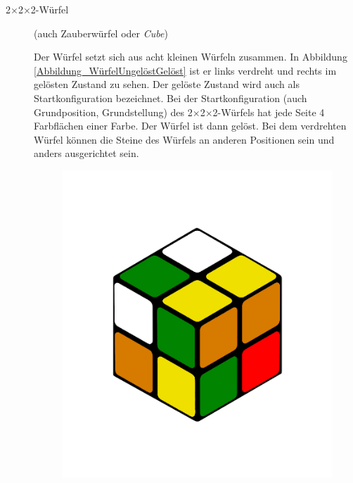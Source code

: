 \documentclass[12pt,a4paper, usenames, dvipsnames]{article}
\theoremstyle{mystyle}
\theoremstyle{definition}
\newcommand{\Ttwo}{2$\times$2$\times$2-}
\begin{document}
\begin{description}


\item[\Ttwo Würfel] (auch Zauberwürfel oder \textit{Cube}) 

Der Würfel setzt sich aus acht kleinen Würfeln zusammen.
In Abbildung \ref{Abbildung_WürfelUngelöstGelöst} ist er links verdreht und rechts im gelösten Zustand zu sehen. Der gelöste Zustand wird auch als Startkonfiguration bezeichnet.
Bei der Startkonfiguration (auch Grundposition, Grundstellung) des \Ttwo Würfels hat jede Seite 4 Farbflächen einer Farbe. Der Würfel ist dann gelöst.  
Bei dem verdrehten Würfel können die Steine des Würfels an anderen Positionen sein und anders ausgerichtet sein.
\begin{figure}[h]
\centering
\includegraphics[scale=0.1]{2x2scrambled.png}

\end{figure}
\end{description}
\end{document}

